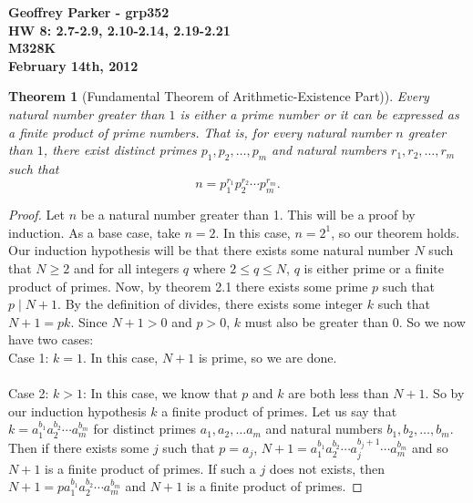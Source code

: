 \documentclass[12pt,leqno]{article}
\numberwithin{equation}{section}
\newtheorem{thm}{Theorem}[section]
\theoremstyle{definition}
\begin{document}
\thispagestyle{plain}
\begin{flushright}
\large{\textbf{Geoffrey Parker - grp352 \\
HW 8: 2.7-2.9, 2.10-2.14, 2.19-2.21\\
M328K \\
February 14th, 2012 \\}}
\end{flushright}

\markboth{}{} \setcounter{section}{0} \baselineskip=18pt

\setcounter{tocdepth}{4}



\setcounter{section}{2}

\setcounter{thm}{6}


\begin{thm}[Fundamental Theorem of Arithmetic-Existence Part)]
Every natural number greater than $1$ is either a prime number or it
can be expressed as a finite product of prime numbers. That is, for
every natural number $n$ greater than $1$, there exist distinct
primes $p_1, p_2, \hdots, p_m$ and natural numbers $r_1, r_2,
\hdots, r_m$ such that \[n = p_1^{r_1}p_2^{r_2}\cdots p_m^{r_m}.\]
\end{thm}

\begin{proof}[Proof]
Let $n$ be a natural number greater than 1.  This will be a proof by induction.  As a base case, take $n = 2$.  In this case, $n = 2^1$, so our theorem holds.  Our induction hypothesis will be that there exists some natural number $N$ such that $N \geq 2$ and for all integers $q$ where $2 \leq q \leq N$, $q$ is either prime or a finite product of primes.  Now, by theorem 2.1 there exists some prime $p$ such that $p \mid N+1$.  By the definition of divides, there exists some integer $k$ such that $N+1 = pk$.  Since $N+1 > 0$ and $p > 0$, $k$ must also be greater than 0.  So we now have two cases:\\
Case 1: $k = 1$.  In this case, $N+1$ is prime, so we are done.\\
\\
Case 2: $k > 1$:  In this case, we know that $p$ and $k$ are both less than $N+1$.  So by our induction hypothesis $k$ a finite product of primes.  Let us say that $k = a_1^{b_1}a_2^{b_2}\cdots a_m^{b_m}$ for distinct primes $a_1, a_2, \hdots a_m$ and natural numbers $b_1, b_2, \hdots, b_m$.  Then if there exists some $j$ such that $p = a_j$, $N+1 = a_1^{b_1}a_2^{b_2}\cdots a_j^{b_j+1}\cdots a_m^{b_m}$ and so $N+1$ is a finite product of primes.  If such a $j$ does not exists, then $N+1 = pa_1^{b_1}a_2^{b_2}\cdots a_m^{b_m}$ and $N+1$ is a finite product of primes.
\end{proof}
\end{document}
